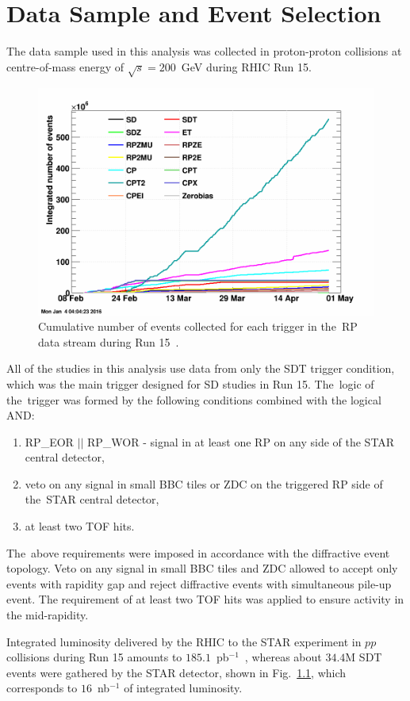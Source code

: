 \chapter{Data Sample and Event Selection}\label{section:star_data_sample}\label{section:star_trigger_selection}
The data sample used in this analysis was collected in proton-proton collisions at centre-of-mass energy of $\sqrt{s}=200$~GeV during RHIC Run 15. %

\begin{figure}[b!]
	\centering
	\includegraphics[width=.6\textwidth]{chapters/dataSampleSTAR/img/nEvents.png}
	\caption{Cumulative number of events collected for each trigger in the~\ac{RP} data stream during Run 15~\cite{pp2ppTrigers,runLogBrowser}. }
	\label{fig:lumiRHIC}
\end{figure}

All of the studies in this analysis use data from only the SDT trigger condition, which was the main trigger designed for SD studies in Run 15. The~logic of the~trigger  was formed by the following conditions combined with the logical AND:
\begin{enumerate}
	\item RP\_EOR $||$ RP\_WOR - signal in at least one RP on any side of the STAR central detector,
	\item veto on any signal in small BBC tiles or ZDC on the triggered RP  side of the~STAR central detector,
	\item at least two TOF hits.
\end{enumerate}
The~above  requirements were imposed in accordance with the diffractive event topology. Veto on any signal in small BBC tiles and ZDC allowed to accept only events with rapidity gap and reject diffractive events with simultaneous pile-up event. The requirement of at least two TOF hits was applied to ensure activity in the mid-rapidity.


Integrated luminosity delivered by the RHIC to the STAR experiment in $pp$ collisions during Run 15 amounts to $185.1$~pb$^{-1}$~\cite{RHIC:rhicRunLuminosity}, whereas about $34.4$M SDT events were gathered by the STAR detector, shown in Fig.~\ref{fig:lumiRHIC}, which corresponds to $16$~nb$^{-1}$ of integrated luminosity.
